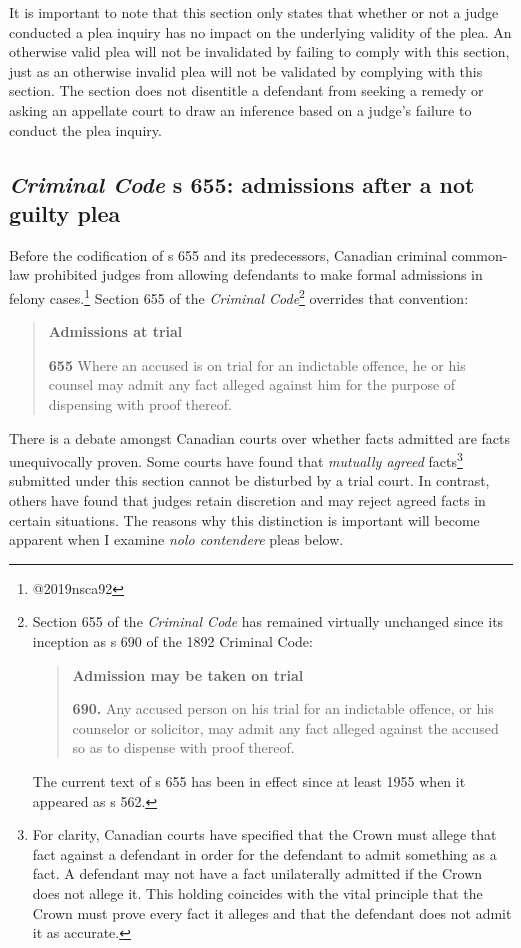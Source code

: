 It is important to note that this section only states that whether or not a judge conducted a plea inquiry has no impact on the underlying validity of the plea. An otherwise valid plea will not be invalidated by failing to comply with this section, just as an otherwise invalid plea will not be validated by complying with this section. The section does not disentitle a defendant from seeking a remedy or asking an appellate court to draw an inference based on a judge's failure to conduct the plea inquiry.

\subsection{\textit{Criminal Code} s 655: admissions after a not guilty plea}

Before the codification of s 655 and its predecessors, Canadian criminal common-law prohibited judges from allowing defendants to make formal admissions in felony cases.\footnote{@2019nsca92} Section 655 of the \textit{Criminal Code}\footnote{Section 655 of the \textit{Criminal Code} has remained virtually unchanged since its inception as s 690 of the 1892 Criminal Code:

\begin{quote}
    \textbf{Admission may be taken on trial}
    
    \textbf{690.} Any accused person on his trial for an indictable offence, or his counselor or solicitor, may admit any fact alleged against the accused so as to dispense with proof thereof.
\end{quote}

The current text of s 655 has been in effect since at least 1955 when it appeared as s 562.} overrides that convention:

\begin{quote}
    \textbf{Admissions at trial}
    
    \textbf{655} Where an accused is on trial for an indictable offence, he or his counsel may admit any fact alleged against him for the purpose of dispensing with proof thereof.
\end{quote}

There is a debate amongst Canadian courts over whether facts admitted are facts unequivocally proven. Some courts have found that \textit{mutually agreed} facts\footnote{For clarity, Canadian courts have specified that the Crown must allege that fact against a defendant in order for the defendant to admit something as a fact. A defendant may not have a fact unilaterally admitted if the Crown does not allege it. This holding coincides with the vital principle that the Crown must prove every fact it alleges and that the defendant does not admit it as accurate.} submitted under this section cannot be disturbed by a trial court. In contrast, others have found that judges retain discretion and may reject agreed facts in certain situations. The reasons why this distinction is important will become apparent when I examine \textit{nolo contendere} pleas below.